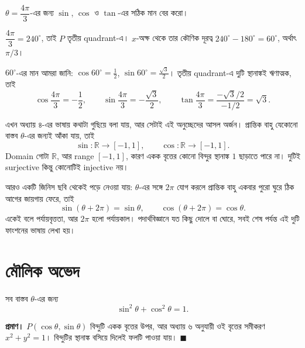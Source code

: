 \documentclass[11pt]{article}
\begin{document}
\begin{example}
$\theta = \dfrac{4\pi}{3}$-এর জন্য $\sin$, $\cos$ ও $\tan$-এর সঠিক মান বের করো।
\end{example}

\begin{solbox}
$\dfrac{4\pi}{3} = 240^\circ$, তাই $P$ তৃতীয় quadrant-এ। $x$-অক্ষ থেকে তার
কৌণিক দূরত্ব $240^\circ - 180^\circ = 60^\circ$, অর্থাৎ $\pi/3$।

$60^\circ$-এর মান আমরা জানি: $\cos 60^\circ = \tfrac{1}{2}$,
$\sin 60^\circ = \tfrac{\sqrt{3}}{2}$। তৃতীয় quadrant-এ দুটি স্থানাঙ্কই
ঋণাত্মক, তাই
\[
  \cos \frac{4\pi}{3} = -\frac{1}{2}, \qquad
  \sin \frac{4\pi}{3} = -\frac{\sqrt{3}}{2}, \qquad
  \tan \frac{4\pi}{3} = \frac{-\sqrt{3}/2}{-1/2} = \sqrt{3} .
\]
\end{solbox}

\begin{remark}
এখন অধ্যায় ৪-এর ভাষায় কথাটা গুছিয়ে বলা যায়, আর সেটাই এই অনুচ্ছেদের আসল
অর্জন। প্রান্তিক বাহু যেকোনো বাস্তব $\theta$-এর জন্যই আঁকা যায়, তাই
\[
  \sin \colon \mathbb{R} \to [-1, 1], \qquad
  \cos \colon \mathbb{R} \to [-1, 1] .
\]
Domain গোটা $\mathbb{R}$, আর range $[-1,1]$, কারণ একক বৃত্তের কোনো বিন্দুর
স্থানাঙ্ক $1$ ছাড়াতে পারে না। দুটিই surjective কিন্তু কোনোটিই injective নয়।

আরও একটি জিনিস ছবি থেকেই পড়ে নেওয়া যায়: $\theta$-এর সঙ্গে $2\pi$ যোগ করলে
প্রান্তিক বাহু একবার পুরো ঘুরে ঠিক আগের জায়গায় ফেরে, তাই
\[
  \sin(\theta + 2\pi) = \sin\theta, \qquad \cos(\theta + 2\pi) = \cos\theta .
\]
একেই বলে পর্যায়বৃত্ততা, আর $2\pi$ হলো পর্যায়কাল। পদার্থবিজ্ঞানে যত কিছু
দোলে বা ঘোরে, সবই শেষ পর্যন্ত এই দুটি ফাংশনের ভাষায় লেখা হয়।
\end{remark}

\section{মৌলিক অভেদ}

\begin{idea}[পিথাগোরীয় অভেদ]
সব বাস্তব $\theta$-এর জন্য
\[
  \sin^2\theta + \cos^2\theta = 1 .
\]
\end{idea}

\noindent
\textbf{প্রমাণ।} $P(\cos\theta, \sin\theta)$ বিন্দুটি একক বৃত্তের উপর, আর
অধ্যায় ৬ অনুযায়ী ওই বৃত্তের সমীকরণ $x^2 + y^2 = 1$। বিন্দুটির স্থানাঙ্ক
বসিয়ে দিলেই ফলটি পাওয়া যায়। $\blacksquare$
\end{document}
